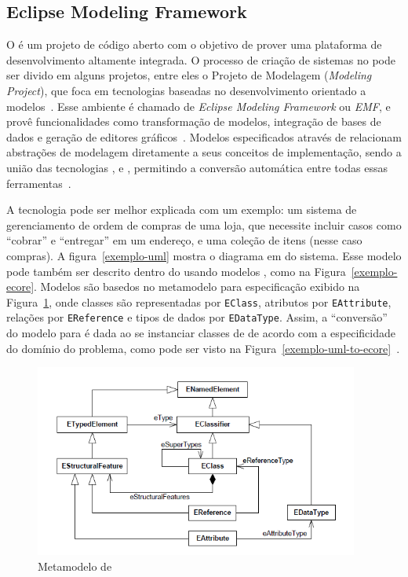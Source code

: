 \subsection{Eclipse Modeling Framework}
O \eclipse é um projeto de código aberto com o objetivo de prover uma plataforma de desenvolvimento altamente integrada. O processo de criação de sistemas no \eclipse pode ser divido em alguns projetos, entre eles o Projeto de Modelagem (\textit{Modeling Project}), que foca em tecnologias baseadas no desenvolvimento orientado a modelos~\cite{steinberg2008emf}. Esse ambiente é chamado de \textit{Eclipse Modeling Framework} ou \textit{EMF}, e provê funcionalidades como transformação de modelos, integração de bases de dados e geração de editores gráficos~\cite{steinberg2008emf}. Modelos especificados através de \emf relacionam abstrações de modelagem diretamente a seus conceitos de implementação, sendo a união das tecnologias \uml, \xml e \java, permitindo a conversão automática entre todas essas ferramentas~\cite{steinberg2008emf}. 

A tecnologia \emf pode ser melhor explicada com um exemplo: um sistema de gerenciamento de ordem de compras de uma loja, que necessite incluir casos como ``cobrar'' e ``entregar'' em um endereço, e uma coleção de itens (nesse caso compras). A figura~\ref{exemplo-uml} mostra o diagrama em \uml do sistema. Esse modelo pode também ser descrito dentro do \emf usando modelos \ecore, como na Figura~\ref{exemplo-ecore}. Modelos \ecore são basedos no metamodelo para especificação exibido na Figura~\ref{metamodelo-ecore}, onde classes são representadas por \texttt{EClass}, atributos por \texttt{EAttribute}, relações por \texttt{EReference} e tipos de dados por \texttt{EDataType}. Assim, a ``conversão'' do modelo \uml para \ecore é dada ao se instanciar classes de \ecore de acordo com a especificidade do domínio do problema, como pode ser visto na Figura~\ref{exemplo-uml-to-ecore}~\cite{steinberg2008emf}. 

\begin{figure}[h]
	\centering
	\includegraphics[width=0.95\textwidth]{figuras/exemplos-emf/metamodelo-ecore.png}
	\caption{Metamodelo de \ecore~\cite{kern2008interchange}}
	\label{metamodelo-ecore}
\end{figure}

